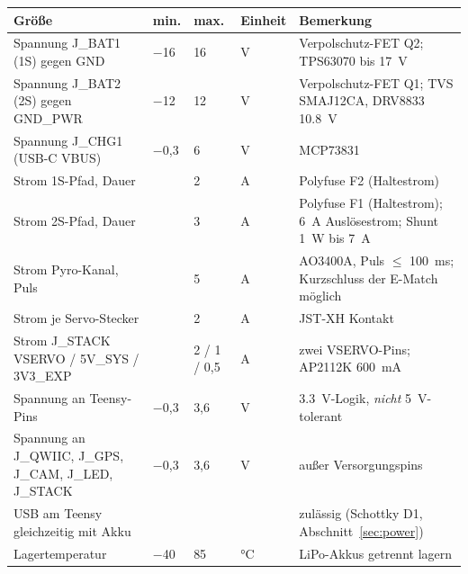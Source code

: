 \documentclass[10pt,a4paper,twoside]{article}
\begin{document}
\begin{tabularx}{\textwidth}{L{44mm} L{16mm} L{16mm} L{12mm} X}
\toprule
\textbf{Größe} & \textbf{min.} & \textbf{max.} & \textbf{Einheit} & \textbf{Bemerkung}\\
\midrule
Spannung J\_BAT1 (1S) gegen GND & $-$16 & 16 & V & Verpolschutz-FET Q2; TPS63070 bis \SI{17}{V}\\
Spannung J\_BAT2 (2S) gegen GND\_PWR & $-$12 & 12 & V & Verpolschutz-FET Q1; TVS SMAJ12CA, DRV8833 \SI{10.8}{V}\\
Spannung J\_CHG1 (USB-C VBUS) & $-$0,3 & 6 & V & MCP73831\\
Strom 1S-Pfad, Dauer & & 2 & A & Polyfuse F2 (Haltestrom)\\
Strom 2S-Pfad, Dauer & & 3 & A & Polyfuse F1 (Haltestrom); \SI{6}{A} Auslösestrom; Shunt \SI{1}{W} bis \SI{7}{A}\\
Strom Pyro-Kanal, Puls & & 5 & A & AO3400A, Puls $\le$ \SI{100}{ms}; Kurzschluss der E-Match möglich\\
Strom je Servo-Stecker & & 2 & A & JST-XH Kontakt\\
Strom J\_STACK VSERVO / 5V\_SYS / 3V3\_EXP & & 2 / 1 / 0,5 & A & zwei VSERVO-Pins; AP2112K \SI{600}{mA}\\
Spannung an Teensy-Pins & $-$0,3 & 3,6 & V & \SI{3.3}{V}-Logik, \emph{nicht} \SI{5}{V}-tolerant\\
Spannung an J\_QWIIC, J\_GPS, J\_CAM, J\_LED, J\_STACK & $-$0,3 & 3,6 & V & außer Versorgungspins\\
USB am Teensy gleichzeitig mit Akku & & & & zulässig (Schottky D1, Abschnitt~\ref{sec:power})\\
Lagertemperatur & $-$40 & 85 & \si{\degreeCelsius} & LiPo-Akkus getrennt lagern\\
\bottomrule
\end{tabularx}
\end{document}
